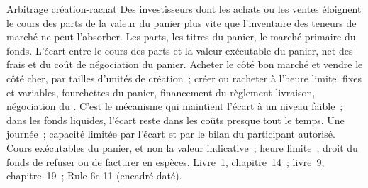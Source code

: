 \begin{strategyfile}{Arbitrage création-rachat}\label{strat:hf:etf-market-making:createredeem}
 Des investisseurs dont les achats ou les ventes éloignent le cours des parts de la valeur du panier plus vite que l'inventaire des teneurs de marché
ne peut l'absorber.
 Les parts, les titres du panier, le marché primaire du fonds.
 L'écart entre le cours des parts et la valeur exécutable du panier, net des frais et du coût de négociation du panier.
 Acheter le côté bon marché et vendre le côté cher, par tailles d'unités de création~; créer ou racheter à l'heure limite.
  fixes et variables, fourchettes du panier, financement du règlement-livraison, négociation du .
 C'est le mécanisme qui maintient l'écart à un niveau faible~; dans les fonds liquides, l'écart reste dans les coûts presque tout le temps.
 Une journée~; capacité limitée par l'écart et par le bilan du participant autorisé.
 Cours exécutables du panier, et non la valeur indicative~; heure limite~; droit du fonds de refuser ou de facturer en espèces.
 Livre~1, chapitre~14~; livre~9, chapitre~19~; Rule 6c-11 (encadré daté).
\end{strategyfile}

